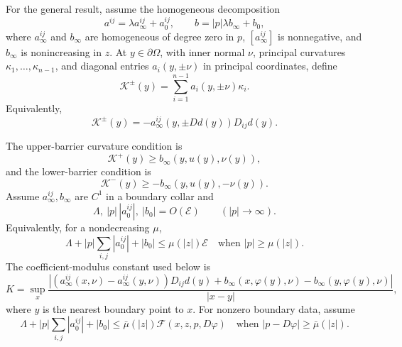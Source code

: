 For the general result, assume the homogeneous decomposition
\begin{equation}
a^{ij}=\lambda a_\infty^{ij}+a_0^{ij},
\qquad
b=|p|\lambda b_\infty+b_0,
\tag{14.43}
\end{equation}
where $a_\infty^{ij}$ and $b_\infty$ are homogeneous of degree zero in $p$,
$[a_\infty^{ij}]$ is nonnegative, and $b_\infty$ is nonincreasing in $z$.
At $y\in\partial\Omega$, with inner normal $\nu$, principal curvatures
$\kappa_1,\ldots,\kappa_{n-1}$, and diagonal entries $a_i(y,\pm\nu)$ in
principal coordinates, define
\begin{equation}
\mathcal K^\pm(y)=\sum_{i=1}^{n-1}a_i(y,\pm\nu)\kappa_i.
\tag{14.44}
\end{equation}
Equivalently,
\begin{equation}
\mathcal K^\pm(y)
=-a_\infty^{ij}(y,\pm Dd(y))D_{ij}d(y).
\tag{14.45}
\end{equation}

The upper-barrier curvature condition is
\begin{equation}
\mathcal K^+(y)\geq b_\infty(y,u(y),\nu(y)),
\tag{14.46}
\end{equation}
and the lower-barrier condition is
\[
\mathcal K^-(y)\geq-b_\infty(y,u(y),-\nu(y)).
\tag{14.46'}
\]
Assume $a_\infty^{ij},b_\infty$ are $C^1$ in a boundary collar and
\begin{equation}
\Lambda,\ |p|\,|a_0^{ij}|,\ |b_0|=O(\mathcal E)
\qquad(|p|\to\infty).
\tag{14.47}
\end{equation}
Equivalently, for a nondecreasing $\mu$,
\begin{equation}
\Lambda+|p|\sum_{i,j}|a_0^{ij}|+|b_0|
\leq\mu(|z|)\mathcal E
\quad\text{when }|p|\geq\mu(|z|).
\tag{14.48}
\end{equation}
The coefficient-modulus constant used below is
\begin{equation}
K=\sup_{x}
\frac{\left|
(a_\infty^{ij}(x,\nu)-a_\infty^{ij}(y,\nu))D_{ij}d(y)
+b_\infty(x,\varphi(y),\nu)-b_\infty(y,\varphi(y),\nu)
\right|}{|x-y|},
\tag{14.49}
\end{equation}
where $y$ is the nearest boundary point to $x$. For nonzero boundary data,
assume
\begin{equation}
\Lambda+|p|\sum_{i,j}|a_0^{ij}|+|b_0|
\leq\bar\mu(|z|)\mathcal F(x,z,p,D\varphi)
\quad\text{when }|p-D\varphi|\geq\bar\mu(|z|).
\tag{14.50}
\end{equation}

